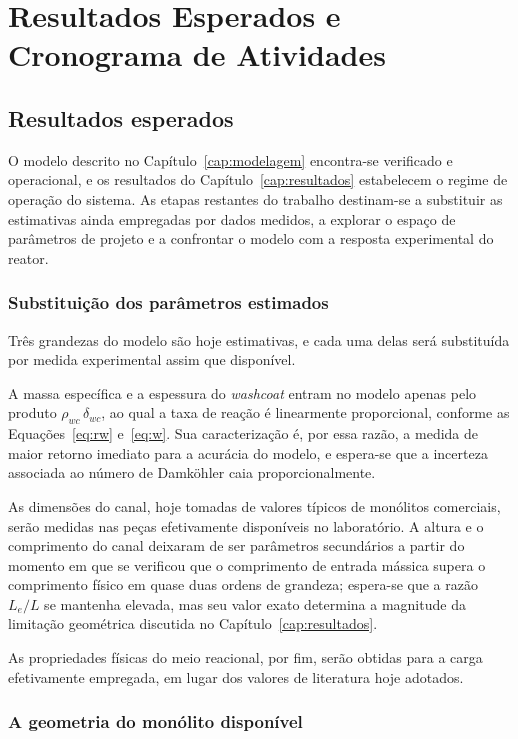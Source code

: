 \chapter{Resultados Esperados e Cronograma de Atividades}
\label{cap:cronograma}

\section{Resultados esperados}

O modelo descrito no Capítulo~\ref{cap:modelagem} encontra-se verificado e
operacional, e os resultados do Capítulo~\ref{cap:resultados} estabelecem o
regime de operação do sistema. As etapas restantes do trabalho destinam-se a
substituir as estimativas ainda empregadas por dados medidos, a explorar o
espaço de parâmetros de projeto e a confrontar o modelo com a resposta
experimental do reator.

\subsection{Substituição dos parâmetros estimados}

Três grandezas do modelo são hoje estimativas, e cada uma delas será substituída
por medida experimental assim que disponível.

A massa específica e a espessura do \textit{washcoat} entram no modelo apenas
pelo produto $\rho_{wc}\,\delta_{wc}$, ao qual a taxa de reação é linearmente
proporcional, conforme as Equações~\eqref{eq:rw} e~\eqref{eq:w}. Sua
caracterização é, por essa razão, a medida de maior retorno imediato para a
acurácia do modelo, e espera-se que a incerteza associada ao número de Damköhler
caia proporcionalmente.

As dimensões do canal, hoje tomadas de valores típicos de monólitos comerciais,
serão medidas nas peças efetivamente disponíveis no laboratório. A altura e o
comprimento do canal deixaram de ser parâmetros secundários a partir do momento
em que se verificou que o comprimento de entrada mássica supera o comprimento
físico em quase duas ordens de grandeza; espera-se que a razão $L_e/L$ se
mantenha elevada, mas seu valor exato determina a magnitude da limitação
geométrica discutida no Capítulo~\ref{cap:resultados}.

As propriedades físicas do meio reacional, por fim, serão obtidas para a carga
efetivamente empregada, em lugar dos valores de literatura hoje adotados.

\subsection{A geometria do monólito disponível}
\label{sec:geomreal}

